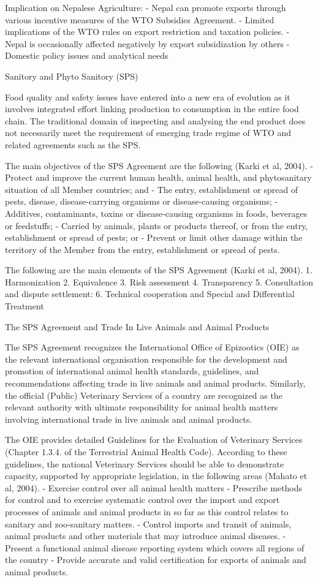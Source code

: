 \documentclass[
]{book}
\begin{document}
Implication on Nepalese Agriculture:
- Nepal can promote exports through various incentive measures of the WTO Subsidies Agreement.
- Limited implications of the WTO rules on export restriction and taxation policies.
- Nepal is occasionally affected negatively by export subsidization by others
- Domestic policy issues and analytical needs

Sanitory and Phyto Sanitory (SPS)

Food quality and safety issues have entered into a new era of evolution as it involves integrated effort linking production to consumption in the entire food chain. The traditional domain of inspecting and analysing the end product does not necessarily meet the requirement of emerging trade regime of WTO and related agreements such as the SPS.

The main objectives of the SPS Agreement are the following (Karki et al, 2004).
- Protect and improve the current human health, animal health, and phytosanitary situation of all Member countries; and
- The entry, establishment or spread of pests, disease, disease-carrying organisms or disease-causing organisms;
- Additives, contaminants, toxins or disease-causing organisms in foods, beverages or feedstuffs;
- Carried by animals, plants or products thereof, or from the entry, establishment or spread of pests; or
- Prevent or limit other damage within the territory of the Member from the entry, establishment or spread of pests.

The following are the main elements of the SPS Agreement (Karki et al, 2004).
1. Harmonization
2. Equivalence
3. Risk assessment
4. Transparency
5. Consultation and dispute settlement:
6. Technical cooperation and Special and Differential Treatment

The SPS Agreement and Trade In Live Animals and Animal Products

The SPS Agreement recognizes the International Office of Epizootics (OIE) as the relevant international organisation responsible for the development and promotion of international animal health standards, guidelines, and recommendations affecting trade in live animals and animal products. Similarly, the official (Public) Veterinary Services of a country are recognized as the relevant authority with ultimate responsibility for animal health matters involving international trade in live animals and animal products.

The OIE provides detailed Guidelines for the Evaluation of Veterinary Services (Chapter 1.3.4. of the Terrestrial Animal Health Code). According to these guidelines, the national Veterinary Services should be able to demonstrate capacity, supported by appropriate legislation, in the following areas (Mahato et al, 2004).
- Exercise control over all animal health matters
- Prescribe methods for control and to exercise systematic control over the import and export processes of animals and animal products in so far as this control relates to sanitary and zoo-sanitary matters.
- Control imports and transit of animals, animal products and other materials that may introduce animal diseases.
- Present a functional animal disease reporting system which covers all regions of the country
- Provide accurate and valid certification for exports of animals and animal products.
\end{document}
